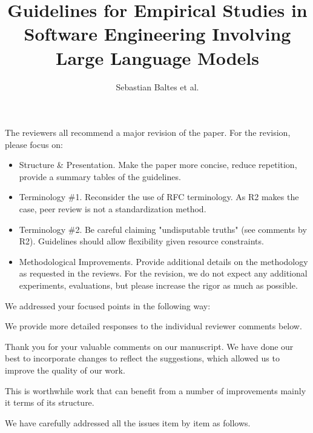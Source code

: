\documentclass[12pt,english]{reviewresponse}
\title{Guidelines for Empirical Studies in Software Engineering Involving Large Language Models}
\author{Sebastian Baltes et al.}
\begin{document}
\maketitle



\editor
\begin{generalcomment}
The reviewers all recommend a major revision of the paper. For the revision, please focus on:

\begin{itemize}
    \item Structure \& Presentation. Make the paper more concise, reduce repetition, provide a summary tables of the guidelines.
    \item Terminology \#1. Reconsider the use of RFC terminology. As R2 makes the case, peer review is not a standardization method.
    \item Terminology \#2. Be careful claiming "undisputable truths" (see comments by R2). Guidelines should allow flexibility given resource constraints.
    \item Methodological Improvements. Provide additional details on the methodology as requested in the reviews. For the revision, we do not expect any additional experiments, evaluations, but please increase the rigor as much as possible.
\end{itemize}

\end{generalcomment}

\begin{revresponse}
We addressed your focused points in the following way:


We provide more detailed responses to the individual reviewer comments below.
\end{revresponse}


\begin{concludingresponse}
	Thank you for your valuable comments on our manuscript. 
	We have done our best to incorporate changes to reflect the suggestions, which allowed us to improve the quality of our work.
\end{concludingresponse}


\reviewer
\begin{generalcomment}
This is worthwhile work that can benefit from a number of improvements mainly it terms of its structure.
\end{generalcomment}
\begin{revresponse}
	We have carefully addressed all the issues item by item as follows.
\end{revresponse}
\end{document}
